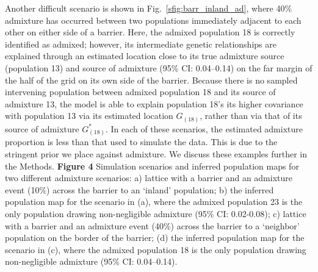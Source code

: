 \documentclass[10pt,letterpaper]{article}
\newcommand{\kadmixsource}[1]{{$G^{*}_{#1}$}}
\begin{document}
Another difficult scenario is shown in Fig.\ \ref{sfig:barr_inland_ad},
where 40\% admixture has occurred between two populations immediately adjacent to each other on either side of a barrier.  
Here, the admixed population 18 is correctly identified as admixed; 
however, its intermediate genetic relationships are explained through an estimated location close to its true admixture source (population 13)
and source of admixture (95\% CI: 0.04--0.14) on the far margin of the half of the grid on its own side of the barrier.
Because there is no sampled intervening population between admixed population 18 and its source of admixture 13, 
the model is able to explain population 18's its higher covariance with population 13 via its estimated location $G_{(18)}$, 
rather than via that of its source of admixture \kadmixsource{(18)}.  
In each of these scenarios, the estimated admixture proportion is less than that used to simulate the data.  This is due to the stringent prior we place against admixture.  We discuss these examples further in the Methods.
%
\newline\newline
{\bf{Figure 4}}    Simulation scenarios and inferred population maps for two different admixture scenarios: a) lattice with a barrier and an admixture event (10\%) across the barrier to an `inland' population; b) the inferred population map for the scenario in (a), where the admixed population 23 is the only population drawing non-negligible admixture (95\% CI: 0.02-0.08); c) lattice with a barrier and an admixture event (40\%) across the barrier to a `neighbor' population on the border of the barrier; (d) the inferred population map for the scenario in (c), where the admixed population 18 is the only population drawing non-negligible admixture (95\% CI: 0.04--0.14).
\newline\newline
\end{document}
